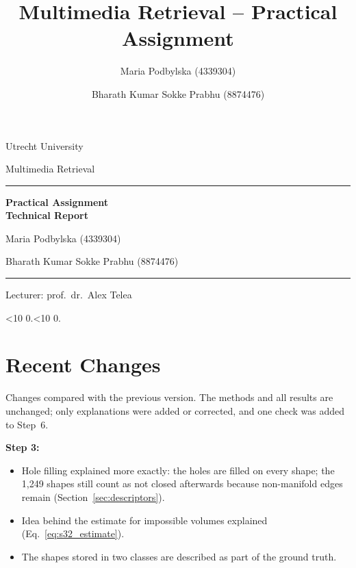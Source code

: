 \documentclass[10pt,a4paper]{article}
\title{Multimedia Retrieval -- Practical Assignment}
\author{Maria Podbylska (4339304) \and Bharath Kumar Sokke Prabhu (8874476)}
\date{}
\begin{document}
\pagestyle{plain}

\begin{titlepage}
\centering
\vspace*{1.5cm}
{\normalsize Utrecht University\par}
\vspace{3pt}
{\normalsize Multimedia Retrieval\par}
\rule{0.85\linewidth}{0.6pt}\par
\vspace{0.8cm}
{\fontsize{30}{38}\selectfont\bfseries Practical Assignment\\ Technical Report\par}
\vspace{1.2cm}
{\LARGE Maria Podbylska (4339304)\par}
\vspace{8pt}
{\LARGE Bharath Kumar Sokke Prabhu (8874476)\par}
\vspace{0.9cm}
\rule{0.85\linewidth}{0.6pt}\par
{}
{\normalsize Lecturer: prof.\ dr.\ Alex Telea\par}
\vspace{4pt}
{\normalsize \ifnum\day<10 0\fi\the\day.\ifnum\month<10 0\fi\the\month.\the\year\par}
\vspace*{1cm}
\end{titlepage}

\section*{Recent Changes}
Changes compared with the previous version. The methods and all results are unchanged; only explanations were added or corrected,
and one check was added to Step~6.

\textbf{Step 3:}
\begin{itemize}
  \item Hole filling explained more exactly: the holes are filled on every shape; the 1,249 shapes still count as not closed
  afterwards because non-manifold edges remain (Section~\ref{sec:descriptors}).
  \item Idea behind the estimate for impossible volumes explained (Eq.~\eqref{eq:s32_estimate}).
  \item The shapes stored in two classes are described as part of the ground truth.
\end{itemize}
\end{document}
